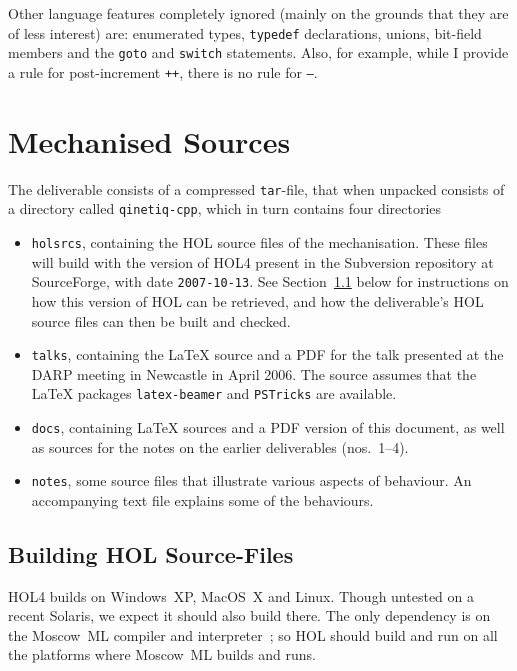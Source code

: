 \documentclass[11pt]{article}
\begin{document}
Other language features completely ignored (mainly on the grounds that
they are of less interest) are: enumerated types, \texttt{typedef}
declarations, unions, bit-field members and the \texttt{goto} and
\texttt{switch} statements.  Also, for example, while I provide a rule
for post-increment \texttt{++}, there is no rule for \texttt{--}.

\appendix
\section{Mechanised Sources}
\label{sec:sources}

The deliverable consists of a compressed \texttt{tar}-file, that when
unpacked consists of a directory called \texttt{qinetiq-cpp}, which in
turn contains four directories
\begin{itemize}
\item \texttt{holsrcs}, containing the HOL source files of the
  mechanisation.  These files will build with the version of HOL4
  present in the Subversion repository at SourceForge, with date
  \texttt{2007-10-13}.  See Section~\ref{sec:getting-hol} below
  for instructions on how this version of HOL can be retrieved, and
  how the deliverable's HOL source files can then be built and
  checked.
\item \texttt{talks}, containing the \LaTeX{} source and a PDF for the
  talk presented at the DARP meeting in Newcastle in April 2006.  The
  source assumes that the \LaTeX{} packages \texttt{latex-beamer} and
  \texttt{PSTricks} are available.
\item \texttt{docs}, containing \LaTeX{} sources and a PDF version of
  this document, as well as sources for the notes on the earlier
  deliverables (nos.~1--4).
\item \texttt{notes}, some \cpp{} source files that illustrate various
  aspects of \cpp{} behaviour.  An accompanying text file explains some
  of the behaviours.
\end{itemize}

\subsection{Building HOL Source-Files}
\label{sec:getting-hol}

HOL4 builds on Windows~XP, MacOS~X and Linux.  Though untested on a
recent Solaris, we expect it should also build there.  The only
dependency is on the Moscow~ML compiler and interpreter~\cite{mosml};
so HOL should build and run on all the platforms where Moscow~ML
builds and runs.
\end{document}
